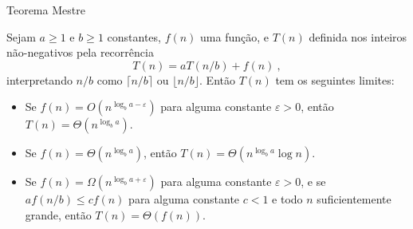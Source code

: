 \begin{frame}{Teorema Mestre}

    \begin{Theorem}
        Sejam $a \geq 1$ e $b \geq 1$ constantes, $f(n)$ uma função, e $T(n)$ definida nos inteiros não-negativos pela recorrência
            \[ T(n) = aT(n/b) + f(n) \ , \]
        interpretando $n/b$ como $\lceil n/b \rceil$ ou $\lfloor n/b \rfloor$. Então $T(n)$ tem os seguintes limites:
            \begin{itemize}
                \item[(i)] Se $f(n) = O(n^{\log_b a - \varepsilon})$ para alguma constante $\varepsilon > 0$, então $T(n) = \Theta(n^{\log_b a})$.
                
                \item[(ii)] Se $f(n) = \Theta(n^{\log_b a})$, então $T(n) = \Theta(n^{\log_b a} \log n)$.

                \item[(iii)] Se $f(n) = \Omega(n^{\log_b a + \varepsilon})$ para alguma constante $\varepsilon > 0$, e se $af(n/b) \leq c f(n)$ para alguma constante $c < 1$ e todo $n$ suficientemente grande, então $T(n) = \Theta(f(n))$.
            \end{itemize}
    \end{Theorem}

    
\end{frame}